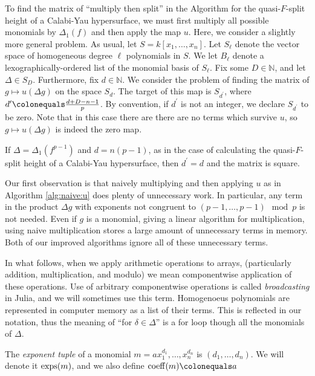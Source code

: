 
To find the matrix of ``multiply then split''
in the Algorithm for the quasi-\(F\)-split height
of a Calabi-Yau hypersurface, 
we must first multiply all possible 
monomials by \(\Delta_{1}(f)\) 
and then apply the map \(u\).
Here, we consider a slightly more general problem.
As usual, let \(S = k[x_{1}, \ldots, x_{n}]\).
Let $S_\ell$ denote the vector space of homogeneous degree $\ell$ polynomials in \(S\).
We let \(B_{\ell}\) denote a lexographically-ordered list
of the monomial basis of \(S_{\ell}\).
Fix some \(D \in \mathbb{N}\), and let \(\Delta \in S_D\).
Furthermore, fix \(d \in \mathbb{N}\).
We consider the problem of finding the matrix of 
\(g \mapsto u(\Delta g)\)
on the space \(S_{d}\).
The target of this map is
\(S_{d^{\prime}}\), where
\(d^{\prime} \colonequals \frac{d+D-n-1}{p}\).
By convention, if \(d^{\prime}\) is not an integer,
we declare \(S_{d^{\prime}}\) to be zero.
Note that in this case there are
there are no terms which survive \(u\), so
\(g \mapsto u(\Delta g)\) is indeed the zero map.

\begin{rmk}
    If \(\Delta = \Delta_{1}(f^{p-1})\) and \(d = n(p-1)\),
	as in the case of calculating the quasi-\(F\)-split
	height of a Calabi-Yau hypersurface, 
	then \(d^{\prime} = d\) and the matrix is 
	square.
\end{rmk}

Our first observation is that naively 
multiplying and then applying \(u\) 
as in Algorithm \ref{alg:naive:u}
does plenty of unnecessary work.
In particular, any term in the 
product \(\Delta g\) with exponents 
not congruent to 
\((p-1, \ldots, p-1) \mod p\)
is not needed. 
Even if \(g\) is a monomial, giving a linear
algorithm for multiplication, using naive
multiplication stores a large amount of unnecessary terms
in memory.
Both of our improved algorithms ignore
all of these unnecessary terms.

In what follows, 
when we apply arithmetic operations to arrays, 
(particularly addition, multiplication, and modulo)
we mean componentwise application of these operations.
Use of arbitrary componentwise operations is called
\textit{broadcasting} in Julia, and we will
sometimes use this term.
Homogenoeus polynomials are represented in computer 
memory as a list of their terms. 
This is reflected in our notation, 
thus the meaning of ``for \(\delta \in \Delta\)''
is a for loop though all the monomials
of \(\Delta\).

\begin{defn}
    \label{def:poly:nota}
    The \textit{exponent tuple} of a monomial 
    $m = ax_{1}^{d_1}, \dots, x_{n}^{d_n}$ is $(d_1, \dots, d_n)$. 
	We will denote it $\operatorname{exps}(m)$, and we also 
    define $\coeff(m) \colonequals a$
\end{defn}

